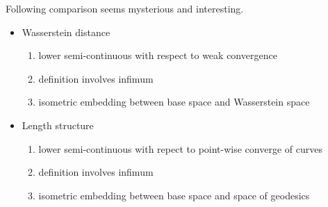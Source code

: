 \begin{rmk} 
	Following comparison seems mysterious and interesting.
	\begin{itemize}
		\item Wasserstein distance
			\begin{enumerate}
				\item lower semi-continuous with respect to weak convergence
				\item definition involves infimum
				\item isometric embedding between base space and Wasserstein space
			\end{enumerate}
		\item Length structure
			\begin{enumerate}
				\item lower semi-continuous with repect to point-wise converge of curves
				\item definition involves infimum
				\item isometric embedding between base space and space of geodesics
			\end{enumerate}
	\end{itemize}
\end{rmk}
